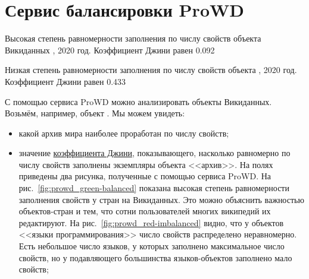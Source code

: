 \chapter{Сервис балансировки ProWD}
\label{ch:prowd}

\begin{marginfigure}[0.0cm]
{
\setlength{\fboxsep}{0pt}%
\setlength{\fboxrule}{1pt}%
}
  \caption[Высокая степень равномерности заполнения по числу свойств объекта Викиданных, 2020 год.]
    {Высокая степень равномерности заполнения по числу свойств объекта Викиданных 
                , 2020 год.
                Коэффициент Джини равен 0.092}%
  \label{fig:prowd_green-balanced}%
\end{marginfigure}

\begin{marginfigure}[0.0cm]
{
\setlength{\fboxsep}{0pt}%
\setlength{\fboxrule}{1pt}%
}
  \caption[Низкая степень равномерности заполнения по числу свойств объекта Викиданных, 2020 год.]
    {Низкая степень равномерности заполнения по числу свойств объекта 
                , 2020 год.
                Коэффициент Джини равен 0.433}%
  \label{fig:prowd_red-imbalanced}%
\end{marginfigure}




С помощью сервиса ProWD можно анализировать объекты Викиданных. 
Возьмём, например, объект . Мы можем увидеть: 
\begin{itemize}
    \item какой архив мира наиболее проработан по числу свойств;

    \item значение \href{https://w.wiki/gg7}{коэффициента Джини}, 
        показывающего, насколько равномерно по числу свойств заполнены экземпляры объекта <<архив>>. 
        На полях приведены два рисунка, полученные с помощью сервиса ProWD. 
        На рис.~\ref{fig:prowd_green-balanced} показана высокая степень 
        равномерности заполнения свойств у стран на Викиданных. 
        Это можно объяснить важностью объектов-стран и тем, что 
        сотни пользователей многих википедий их редактируют.
        На рис.~\ref{fig:prowd_red-imbalanced} видно, что 
        у объектов <<языки программирования>> число свойств распределено неравномерно. 
        Есть небольшое число языков, у которых заполнено максимальное число свойств, 
        но у подавляющего большинства языков-объектов заполнено мало свойств;
\end{itemize}

